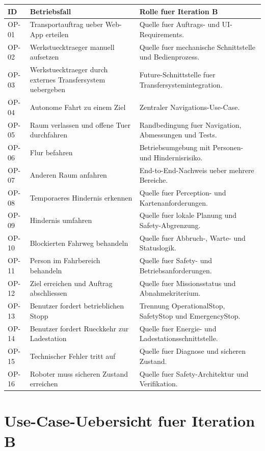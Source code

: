 \begin{longtable}{L{0.14\textwidth} L{0.42\textwidth} L{0.30\textwidth}}
\toprule
ID & Betriebsfall & Rolle fuer Iteration B \\
\midrule
OP-01 & Transportauftrag ueber Web-App erteilen & Quelle fuer Auftrags- und UI-Requirements. \\
OP-02 & Werkstuecktraeger manuell aufsetzen & Quelle fuer mechanische Schnittstelle und Bedienprozess. \\
OP-03 & Werkstuecktraeger durch externes Transfersystem uebergeben & Future-Schnittstelle fuer Transfersystemintegration. \\
OP-04 & Autonome Fahrt zu einem Ziel & Zentraler Navigations-Use-Case. \\
OP-05 & Raum verlassen und offene Tuer durchfahren & Randbedingung fuer Navigation, Abmessungen und Tests. \\
OP-06 & Flur befahren & Betriebsumgebung mit Personen- und Hindernisrisiko. \\
OP-07 & Anderen Raum anfahren & End-to-End-Nachweis ueber mehrere Bereiche. \\
OP-08 & Temporaeres Hindernis erkennen & Quelle fuer Perception- und Kartenanforderungen. \\
OP-09 & Hindernis umfahren & Quelle fuer lokale Planung und Safety-Abgrenzung. \\
OP-10 & Blockierten Fahrweg behandeln & Quelle fuer Abbruch-, Warte- und Statuslogik. \\
OP-11 & Person im Fahrbereich behandeln & Quelle fuer Safety- und Betriebsanforderungen. \\
OP-12 & Ziel erreichen und Auftrag abschliessen & Quelle fuer Missionsstatus und Abnahmekriterium. \\
OP-13 & Benutzer fordert betrieblichen Stopp & Trennung OperationalStop, SafetyStop und EmergencyStop. \\
OP-14 & Benutzer fordert Rueckkehr zur Ladestation & Quelle fuer Energie- und Ladestationsschnittstelle. \\
OP-15 & Technischer Fehler tritt auf & Quelle fuer Diagnose und sicheren Zustand. \\
OP-16 & Roboter muss sicheren Zustand erreichen & Quelle fuer Safety-Architektur und Verifikation. \\
\bottomrule
\end{longtable}

\section{Use-Case-Uebersicht fuer Iteration B}

